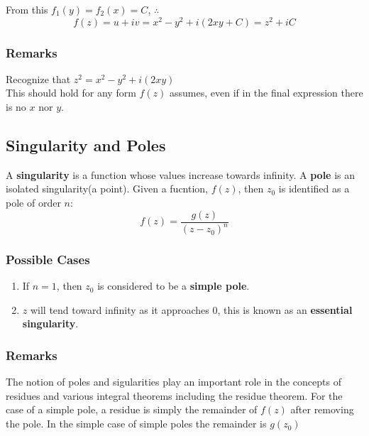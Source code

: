 \documentclass[12pt]{article}
\begin{document}
From this $f_1(y) = f_2(x) = C$, $\therefore$
\begin{equation*}
   f(z)=u+iv = x^2 - y^2 + i(2xy+C) = z^2 +iC 
\end{equation*}

\subsubsection*{Remarks}
Recognize that $z^2 = x^2 - y^2 + i(2xy)$\\
This should hold for any form $f(z)$ assumes, even if in the final expression there is no $x$ nor $y$.


\subsection{Singularity and Poles}
A \textbf{singularity} is a function whose values increase towards infinity. A \textbf{pole} is an isolated singularity(a point). Given a fucntion, $f(z)$, then $z_0$ is identified as a pole of order $n$:
\begin{equation}
	f(z) = \frac{g(z)}{(z-z_0)^n}
\end{equation}
\subsubsection{Possible Cases}
\begin{enumerate}
	\item If $n=1$, then $z_0$ is considered to be a \textbf{simple pole}.
	\item $z$ will tend toward infinity as it approaches $0$, this is known as an \textbf{essential singularity}. 
\end{enumerate}

\subsubsection*{Remarks}
The notion of poles and sigularities play an important role in the concepts of residues and various integral theorems including the residue theorem. For the case of a simple pole, a residue is simply the remainder of $f(z)$ after removing the pole. In the simple case of simple poles the remainder is $g(z_0)$
\end{document}
